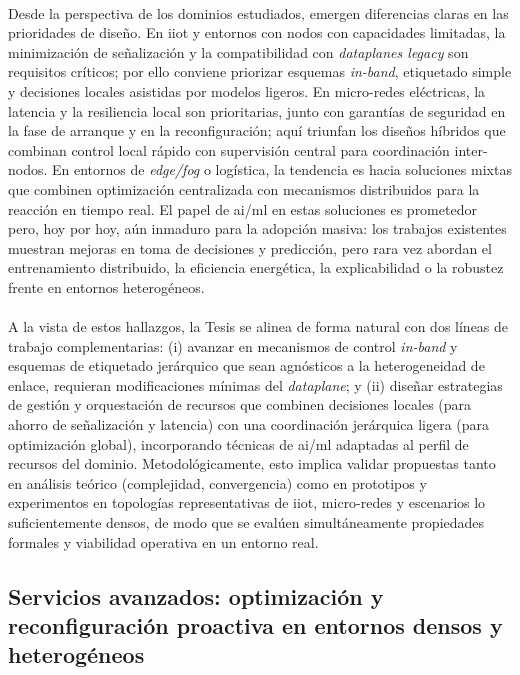 \\
Desde la perspectiva de los dominios estudiados, emergen diferencias claras en las prioridades de diseño. En \gls{iiot} y entornos con nodos con capacidades limitadas, la minimización de señalización y la compatibilidad con \textit{dataplanes legacy} son requisitos críticos; por ello conviene priorizar esquemas \textit{in-band}, etiquetado simple y decisiones locales asistidas por modelos ligeros. En micro-redes eléctricas, la latencia y la resiliencia local son prioritarias, junto con garantías de seguridad en la fase de arranque y en la reconfiguración; aquí triunfan los diseños híbridos que combinan control local rápido con supervisión central para coordinación inter-nodos. En entornos de \textit{edge/fog} o logística, la tendencia es hacia soluciones mixtas que combinen optimización centralizada con mecanismos distribuidos para la reacción en tiempo real. El papel de \gls{ai}/\gls{ml} en estas soluciones es prometedor pero, hoy por hoy, aún inmaduro para la adopción masiva: los trabajos existentes muestran mejoras en toma de decisiones y predicción, pero rara vez abordan el entrenamiento distribuido, la eficiencia energética, la explicabilidad o la robustez frente en entornos heterogéneos.\\
\\
A la vista de estos hallazgos, la Tesis se alinea de forma natural con dos líneas de trabajo complementarias: (i) avanzar en mecanismos de control \textit{in-band} y esquemas de etiquetado jerárquico que sean agnósticos a la heterogeneidad de enlace, requieran modificaciones mínimas del \textit{dataplane}; y (ii) diseñar estrategias de gestión y orquestación de recursos que combinen decisiones locales (para ahorro de señalización y latencia) con una coordinación jerárquica ligera (para optimización global), incorporando técnicas de \gls{ai}/\gls{ml} adaptadas al perfil de recursos del dominio. Metodológicamente, esto implica validar propuestas tanto en análisis teórico (complejidad, convergencia) como en prototipos y experimentos en topologías representativas de \gls{iiot}, micro-redes y escenarios lo suficientemente densos, de modo que se evalúen simultáneamente propiedades formales y viabilidad operativa en un entorno real.




\subsection{Servicios avanzados: optimización y reconfiguración proactiva en entornos densos y heterogéneos}

